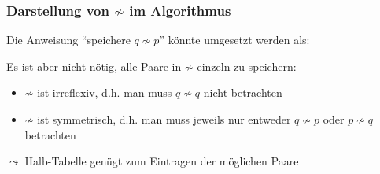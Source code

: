 \documentclass[aspectratio=1610,onlymath]{beamer}
\begin{document}
\begin{frame}\frametitle{Darstellung von $\not\sim$ im Algorithmus}

Die Anweisung "`speichere $q\not\sim p$"' könnte umgesetzt werden als:\\[1ex]
\bigskip

Es ist aber nicht nötig, alle Paare in ${\not\sim}$ einzeln zu speichern:
\begin{itemize}
\item $\not\sim$ ist irreflexiv, d.h. man muss $q\not\sim q$ nicht betrachten
\item $\not\sim$ ist symmetrisch, d.h. man muss jeweils nur entweder $q\not\sim p$ oder $p\not\sim q$ betrachten\pause
\end{itemize}
$\leadsto$ Halb-Tabelle genügt zum Eintragen der möglichen Paare\medskip


\end{frame}

\newcommand{\hicell}[1]{\only<#1|handout:0>{\cellcolor{strongyellow}}}
\newcommand{\upcell}[2]{\only<#1|handout:0>{\cellcolor{strongyellow}}\only<#1->{#2}}
\newcommand{\locell}[1]{\only<#1|handout:0>{\cellcolor{darkgreen!20}}}
\end{document}
